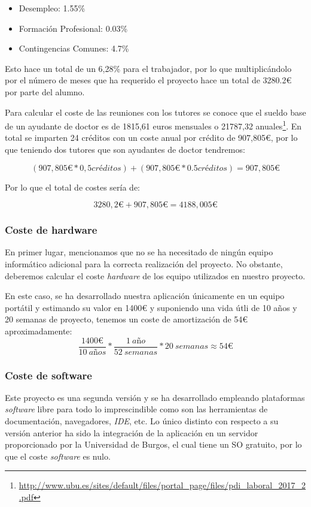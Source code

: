 \begin{itemize}
	\item Desempleo: 1.55\%
	\item Formación Profesional: 0.03\%
	\item Contingencias Comunes: 4.7\%
\end{itemize}

Esto hace un total de un 6,28\% para el trabajador, por lo que multiplicándolo por el número de meses que ha requerido el proyecto hace un total de 3280.2\euro{} por parte del alumno.

Para calcular el coste de las reuniones con los tutores se conoce que el sueldo base de un ayudante de doctor es de 1815,61 euros mensuales o 21787,32 anuales\footnote{\url{http://www.ubu.es/sites/default/files/portal_page/files/pdi_laboral_2017_2.pdf}}. En total se imparten 24 créditos con un coste anual por crédito de 907,805\euro{}, por lo que teniendo dos tutores que son ayudantes de doctor tendremos:

\[ (907,805\euro{} * 0,5 créditos) + (907,805\euro{} * 0.5 créditos) = 907,805\euro{}\]

Por lo que el total de costes sería de:

\[ 3280,2\euro{} + 907,805\euro{} = 4188,005\euro{} \]

\subsubsection{Coste de hardware}
En primer lugar, mencionamos que no se ha necesitado de ningún equipo informático adicional para la correcta realización del proyecto. No obstante, deberemos calcular el coste \textit{hardware} de los equipo utilizados en nuestro proyecto.

En este caso, se ha desarrollado nuestra aplicación únicamente en un equipo portátil y estimando su valor en 1400\euro{} y suponiendo una vida útli de 10 años y 20 semanas de proyecto, tenemos un coste de amortización de 54\euro{} aproximadamente:
\[ \frac{1400\euro}{10 \ a\textit{ñ}os} * \frac{1 \ a\textit{ñ}o}{52 \ semanas} * 20 \ semanas \approx 54\euro \]

\subsubsection{Coste de software}
Este proyecto es una segunda versión y se ha desarrollado empleando plataformas \textit{software} libre para todo lo imprescindible como son las herramientas de documentación, navegadores, \textit{IDE}, etc. Lo único distinto con respecto a su versión anterior ha sido la integración de la aplicación en un servidor proporcionado por la Universidad de Burgos, el cual tiene un SO gratuito, por lo que el coste \textit{software} es nulo.

